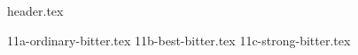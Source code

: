 \clearpage
{}
\divisorLine
{header.tex}
\begin{multicols}{2}
{11a-ordinary-bitter.tex}
{11b-best-bitter.tex}
{11c-strong-bitter.tex}
\end{multicols}